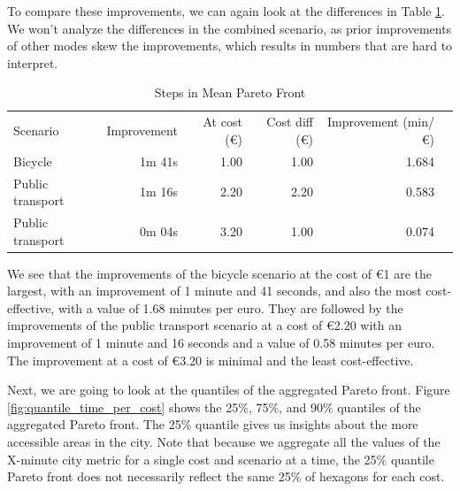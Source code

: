 To compare these improvements, we can again look at the differences in Table \ref{tab:differences_in_mean_pareto_front}.
We won't analyze the differences in the combined scenario, as prior improvements of other modes skew the improvements, which results in numbers that are hard to interpret.

\begin{table}
  \caption{Steps in Mean Pareto Front}
  \label{tab:differences_in_mean_pareto_front}
  \begin{center}
    \begin{tabular}{lrrrrl}
     Scenario & Improvement & At cost (\euro) & Cost diff (\euro) & Improvement (min/\euro) \\
     Bicycle & 1m 41s & 1.00 & 1.00 & 1.684 \\
     Public transport & 1m 16s & 2.20 & 2.20 & 0.583 \\
     Public transport & 0m 04s & 3.20 & 1.00 & 0.074 \\
    \end{tabular}
  \end{center}
\end{table}

We see that the improvements of the bicycle scenario at the cost of \euro{1} are the largest, with an improvement of 1 minute and 41 seconds, and also the most cost-effective, with a value of 1.68 minutes per euro.
They are followed by the improvements of the public transport scenario at a cost of \euro{2.20} with an improvement of 1 minute and 16 seconds and a value of 0.58 minutes per euro.
The improvement at a cost of \euro{3.20} is minimal and the least cost-effective.

Next, we are going to look at the quantiles of the aggregated Pareto front.
Figure \ref{fig:quantile_time_per_cost} shows the 25\%, 75\%, and 90\% quantiles of the aggregated Pareto front.
The 25\% quantile gives us insights about the more accessible areas in the city.
Note that because we aggregate all the values of the X-minute city metric for a single cost and scenario at a time, the 25\% quantile Pareto front does not necessarily reflect the same 25\% of hexagons for each cost.

